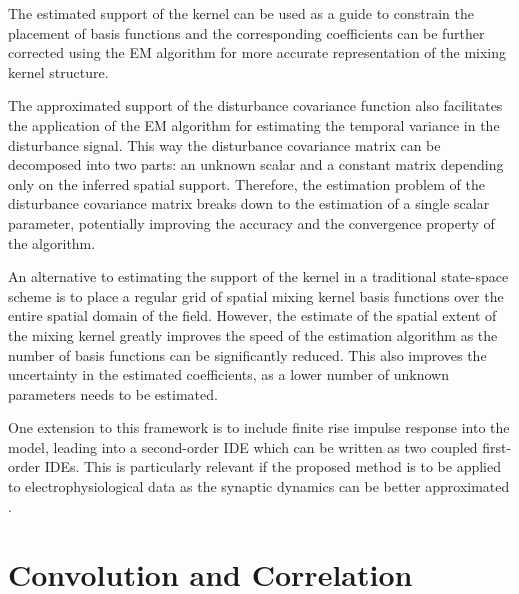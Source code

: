 \documentclass[10pt,twocolumn,twoside]{IEEEtran}
\begin{document}
{The estimated support of the kernel can be used as a guide to constrain the placement of basis functions and the corresponding coefficients can be further corrected using the EM algorithm for more accurate representation of the mixing kernel structure.


The approximated support of the disturbance covariance function also facilitates the application of the EM algorithm for estimating the temporal variance in the disturbance signal.
This way the disturbance covariance matrix can be decomposed into two parts: an unknown scalar and a constant matrix depending only on the inferred spatial support.
Therefore, the estimation problem of the disturbance covariance matrix breaks down to the estimation of a single scalar parameter, potentially improving the accuracy and the convergence property of the algorithm.


An alternative to estimating the support of the kernel in a traditional state-space scheme is to place a regular grid of spatial mixing kernel basis functions over the entire spatial domain of the field.
However, the estimate of the spatial extent of the mixing kernel greatly improves the speed of the estimation algorithm as the number of basis functions can be significantly reduced.
This also improves the uncertainty in the estimated coefficients, as a lower number of unknown parameters needs to be estimated.


One extension to this framework is to include finite rise impulse response into the model, leading into a second-order IDE which can be written as two coupled first-order IDEs.
This is particularly relevant if the proposed method is to be applied to electrophysiological data as the synaptic dynamics can be better approximated \cite{VanRotterdam1982}.



\section{Convolution and Correlation}\label{ap:CorrelationAnalysis}

}
\end{document}
